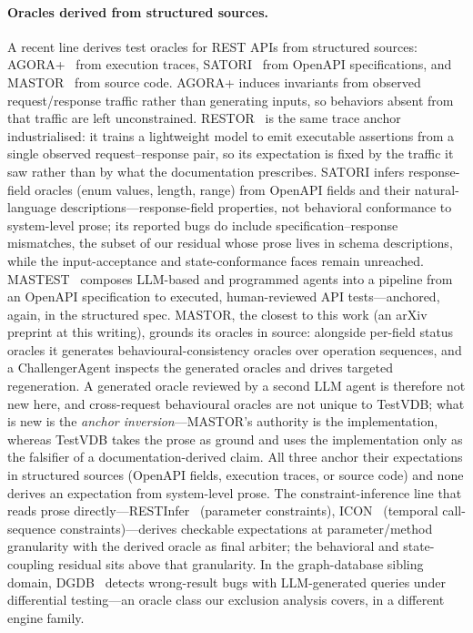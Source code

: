 \documentclass[acmsmall,screen,review,anonymous]{acmart}
\newcommand{\system}{TestVDB}
\begin{document}
\paragraph{Oracles derived from structured sources.}
A recent line derives test oracles for REST APIs from structured sources: AGORA+~\cite{agoraplus25} from execution traces, SATORI~\cite{satori25} from OpenAPI specifications, and MASTOR~\cite{mastor26} from source code. AGORA+ induces invariants from observed request/response traffic rather than generating inputs, so behaviors absent from that traffic are left unconstrained. RESTOR~\cite{restor26} is the same trace anchor industrialised: it trains a lightweight model to emit executable assertions from a single observed request--response pair, so its expectation is fixed by the traffic it saw rather than by what the documentation prescribes. SATORI infers response-field oracles (enum values, length, range) from OpenAPI fields and their natural-language descriptions---response-field properties, not behavioral conformance to system-level prose; its reported bugs do include specification--response mismatches, the subset of our residual whose prose lives in schema descriptions, while the input-acceptance and state-conformance faces remain unreached. MASTEST~\cite{mastest26} composes LLM-based and programmed agents into a pipeline from an OpenAPI specification to executed, human-reviewed API tests---anchored, again, in the structured spec. MASTOR, the closest to this work (an arXiv preprint at this writing), grounds its oracles in source: alongside per-field status oracles it generates behavioural-consistency oracles over operation sequences, and a ChallengerAgent inspects the generated oracles and drives targeted regeneration. A generated oracle reviewed by a second LLM agent is therefore not new here, and cross-request behavioural oracles are not unique to \system{}; what is new is the \emph{anchor inversion}---MASTOR's authority is the implementation, whereas \system{} takes the prose as ground and uses the implementation only as the falsifier of a documentation-derived claim. All three anchor their expectations in structured sources (OpenAPI fields, execution traces, or source code) and none derives an expectation from system-level prose. The constraint-inference line that reads prose directly---RESTInfer~\cite{restinfer22} (parameter constraints), ICON~\cite{icon16} (temporal call-sequence constraints)---derives checkable expectations at parameter/method granularity with the derived oracle as final arbiter; the behavioral and state-coupling residual sits above that granularity. In the graph-database sibling domain, DGDB~\cite{dgdb24} detects wrong-result bugs with LLM-generated queries under differential testing---an oracle class our exclusion analysis covers, in a different engine family.
\end{document}
